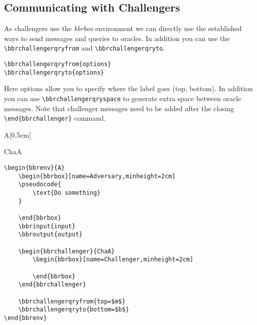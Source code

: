 \documentclass[a4paper]{report}
\begin{document}
\subsection{Communicating with Challengers}
As challengers use the \emph{bbrbox} environment we can directly use the established ways to send messages and
queries to oracles. In addition you can use the \lstinline$\bbrchallengerqryfrom$ and \lstinline$\bbrchallengerqryto$.
\begin{lstlisting}
\bbrchallengerqryfrom{options}
\bbrchallengerqryto{options}
\end{lstlisting}
Here options allow you to specify where the label goes (top, bottom). In addition you can use
\lstinline$\bbrchallengerqryspace$ to generate extra space between oracle messages. Note
that challenger messages need to be added after the closing \lstinline$\end{bbrchallenger}$ command.

\vspace{2em}
\begin{bbrenv}[1cm]{A}[0.5cm]
	\begin{bbrbox}[name=Adversary,minheight=2cm]

	\end{bbrbox}

	\begin{bbrchallenger}{ChaA}
		\begin{bbrbox}[name=Challenger,minheight=2cm]

		\end{bbrbox}
	\end{bbrchallenger}

\end{bbrenv}

\begin{lstlisting}
\begin{bbrenv}{A}
	\begin{bbrbox}[name=Adversary,minheight=2cm]
	\pseudocode{
		\text{Do something}
	}

	\end{bbrbox}
	\bbrinput{input}
	\bbroutput{output}

	\begin{bbrchallenger}{ChaA}
		\begin{bbrbox}[name=Challenger,minheight=2cm]

		\end{bbrbox}
	\end{bbrchallenger}

	\bbrchallengerqryfrom{top=$m$}
	\bbrchallengerqryto{bottom=$b$}
\end{bbrenv}
\end{lstlisting}
\end{document}
